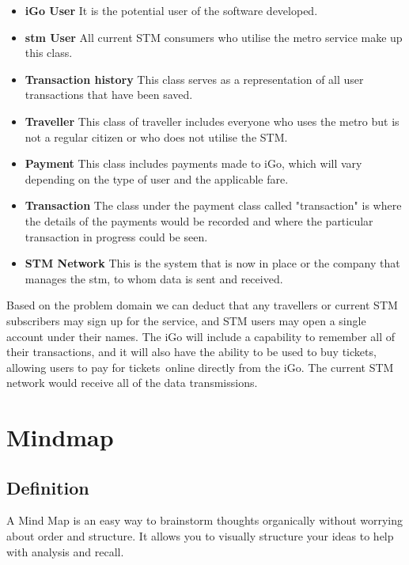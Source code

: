 \documentclass[a4paper,12pt]{article}
\begin{document}
\begin{itemize}[noitemsep]
    \item \textbf{iGo User} It is the potential user of the software developed.
    \item \textbf{stm User} All current STM consumers who utilise the metro service make up this class.
    \item \textbf{Transaction history} This class serves as a representation of all user transactions that have been saved.
    \item \textbf{Traveller} This class of traveller includes everyone who uses the metro but is not a regular citizen or who does not utilise the STM.
    \item \textbf{Payment} This class includes payments made to iGo, which will vary depending on the type of user and the applicable fare.
    \item \textbf{Transaction} The class under the payment class called "transaction" is where the details of the payments would be recorded and where the particular transaction in progress could be seen.
    \item \textbf{STM Network} This is the system that is now in place or the company that manages the stm, to whom data is sent and received.
\end{itemize} \par

Based on the problem domain we can deduct that any travellers or current STM subscribers may sign up for the service, and STM users may open a single account under their names. The iGo will include a capability to remember all of their transactions, and it will also have the ability to be used to buy tickets, allowing users to pay for tickets online directly from the iGo. The current STM network would receive all of the data transmissions.

\newpage
\section {Mindmap}
\subsection{Definition}
A Mind Map is an easy way to brainstorm thoughts organically without worrying about order and structure. It allows you to visually structure your ideas to help with analysis and recall. \\ \par
\end{document}
